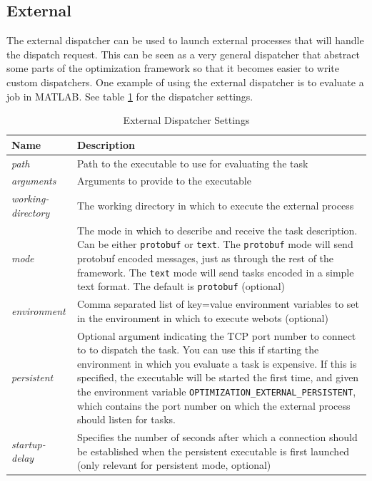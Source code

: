 \documentclass{report}
\begin{document}
\subsection{External}
The external dispatcher can be used to launch external processes that will
handle the dispatch request. This can be seen as a very general dispatcher that
abstract some parts of the optimization framework so that it becomes easier
to write custom dispatchers. One example of using the external dispatcher is
to evaluate a job in MATLAB. See table \ref{tab:external_settings} for
the dispatcher settings.

\begin{table}[h!tb]\caption{External Dispatcher Settings}\label{tab:external_settings}\vspace{0.1in}
	\centering

	\begin{tabular}{p{3cm} p{12cm}}
		\toprule
		\textbf{Name} & \textbf{Description} \\
		\midrule
		\textit{path} & Path to the executable to use for evaluating the task \\
		\textit{arguments} & Arguments to provide to the executable \\
		\textit{working-directory} & The working directory in which to execute
		                             the external process \\
		\textit{mode} & The mode in which to describe and receive the task
		                description. Can be either \verb!protobuf! or
		                \verb!text!. The \verb!protobuf! mode will send protobuf
		                encoded messages, just as through the rest of the
		                framework. The \verb!text! mode will send tasks
		                encoded in a simple text format. The default is
		                \verb!protobuf! (optional)\\
		\textit{environment} & Comma separated list of key=value environment variables
		              to set in the environment in which to execute webots
		              (optional) \\
		\textit{persistent} & Optional argument indicating the TCP port number
		                      to connect to to dispatch the task. You can use
		                      this if starting the environment in which you
		                      evaluate a task is expensive. If this is specified,
		                      the executable will be started the first time, and
		                      given the environment variable
		                      \verb!OPTIMIZATION_EXTERNAL_PERSISTENT!, which
		                      contains the port number on which the external
		                      process should listen for tasks. \\
		\textit{startup-delay} & Specifies the number of seconds after which a
		                         connection should be established when the
		                         persistent executable is first launched (only
		                         relevant for persistent mode, optional) \\
		\bottomrule
	\end{tabular}
\end{table}
\end{document}

